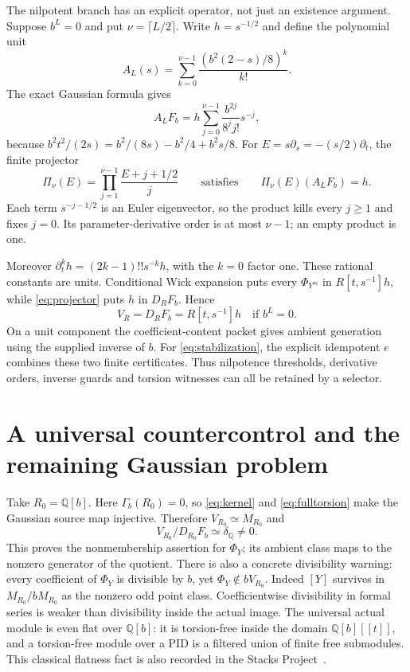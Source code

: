 \documentclass[11pt]{article}
\theoremstyle{definition}\newtheorem{definition}[theorem]{Definition}
\theoremstyle{remark}\newtheorem{remark}[theorem]{Remark}
\begin{document}
The nilpotent branch has an explicit operator, not just an
existence argument. Suppose $b^L=0$ and put
$\nu=\lceil L/2\rceil$. Write $h=s^{-1/2}$ and define the
polynomial unit
\[
 A_L(s)=\sum_{k=0}^{\nu-1}\frac{(b^2(2-s)/8)^k}{k!}.
\]
The exact Gaussian formula gives
\[
 A_LF_b=h\sum_{j=0}^{\nu-1}\frac{b^{2j}}{8^jj!}s^{-j},
\]
because $b^2t^2/(2s)=b^2/(8s)-b^2/4+b^2s/8$.
For $E=s\partial_s=-(s/2)\partial_t$, the finite projector
\begin{equation}\label{eq:projector}
 \Pi_\nu(E)=\prod_{j=1}^{\nu-1}\frac{E+j+1/2}{j}
 \qquad\text{satisfies}\qquad
 \Pi_\nu(E)(A_LF_b)=h.
\end{equation}
Each term $s^{-j-1/2}$ is an Euler eigenvector, so the product
kills every $j\ge1$ and fixes $j=0$. Its parameter-derivative
order is at most $\nu-1$; an empty product is one.

Moreover
$\partial_t^kh=(2k-1)!!s^{-k}h$, with the $k=0$ factor one.
These rational constants are units. Conditional Wick expansion
puts every $\Phi_{Y^m}$ in $R[t,s^{-1}]h$, while
\eqref{eq:projector} puts $h$ in $D_RF_b$. Hence
\[
 V_R=D_RF_b=R[t,s^{-1}]h\quad\text{if }b^L=0.
\]
On a unit component the coefficient-content packet gives
ambient generation using the supplied inverse of $b$. For
\eqref{eq:stabilization}, the explicit idempotent $e$ combines
these two finite certificates. Thus nilpotence thresholds,
derivative orders, inverse guards and torsion witnesses can all
be retained by a selector.

\section{A universal countercontrol and the remaining Gaussian problem}

Take $R_0=\mathbb Q[b]$. Here $\Gamma_b(R_0)=0$, so
\eqref{eq:kernel} and \eqref{eq:fulltorsion} make the Gaussian
source map injective. Therefore $V_{R_0}\simeq M_{R_0}$ and
\[
 V_{R_0}/D_{R_0}F_b\simeq\delta_{\mathbb Q}\ne0.
\]
This proves the nonmembership assertion for $\Phi_Y$; its
ambient class maps to the nonzero generator of the quotient.
There is also a concrete divisibility warning: every coefficient
of $\Phi_Y$ is divisible by $b$, yet $\Phi_Y\notin bV_{R_0}$.
Indeed $[Y]$ survives in $M_{R_0}/bM_{R_0}$ as the nonzero
odd point class. Coefficientwise divisibility in formal series
is weaker than divisibility inside the actual image.
The universal actual module is even flat over $\mathbb Q[b]$:
it is torsion-free inside the domain $\mathbb Q[b][[t]]$, and
a torsion-free module over a PID is a filtered union of finite
free submodules. This classical flatness fact is also recorded
in the Stacks Project~\cite[Lemma~15.22.11]{Stacks}.
\end{document}
